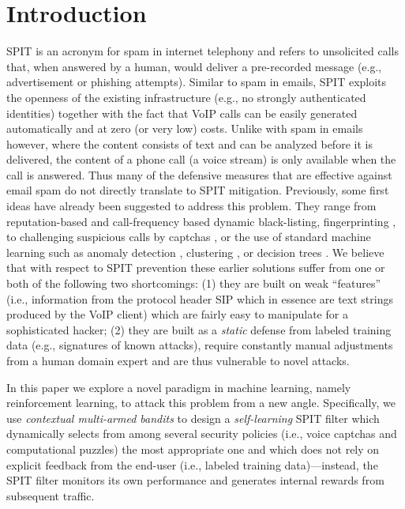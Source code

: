 \documentclass{llncs}
\begin{document}
\section{Introduction}
\label{seq:introduction}
SPIT is an acronym for spam in internet telephony and refers to unsolicited calls 
that, when answered by a human, would deliver a pre-recorded message (e.g., advertisement or phishing attempts). 
Similar to spam in emails, SPIT exploits the openness of the existing infrastructure (e.g., no 
strongly authenticated identities) together with the fact that VoIP calls can be easily generated 
automatically and at zero (or very low) costs. Unlike with spam in emails however, where the content consists
of text and can be analyzed before it is delivered, the content of a phone call (a voice stream) is only 
available when the call is answered. Thus many of the defensive measures that are effective against email spam 
do not directly translate to SPIT mitigation.
Previously, some first ideas have already been suggested to address this problem. 
They range from reputation-based  \cite{Kolan07,fde} and call-frequency based \cite{Shin06} dynamic black-listing, 
fingerprinting \cite{C06}, to challenging suspicious calls by captchas \cite{schlegel06,dtmf-captcha-for-SPIT,quitt:icc}, or 
the use of standard machine learning such as anomaly detection \cite{nassar-SVM,nassar10}, clustering \cite{wu09},
or decision trees \cite{sin11}. 
We believe that with respect to SPIT prevention these earlier solutions suffer from one or both of the following
two shortcomings: (1) they are built on weak ``features'' (i.e., information from the protocol header SIP which in
essence are text strings produced by the VoIP client) which are fairly easy to manipulate for a sophisticated
hacker; (2) they are built as a {\em static} defense from labeled training data (e.g., signatures of known attacks),
require constantly manual adjustments from a human domain expert and are thus vulnerable to novel
attacks.

In this paper we explore a novel paradigm in machine learning, namely reinforcement learning, to attack 
this problem from a new angle. Specifically, we use {\em contextual multi-armed bandits} to design
a {\em self-learning} SPIT filter which dynamically selects from among several security 
policies (i.e., voice captchas and computational puzzles) the most appropriate one and which
does not rely on explicit feedback from the end-user (i.e., labeled training data)---instead, the SPIT filter
monitors its own performance and generates internal rewards from subsequent traffic.
 
\end{document}
